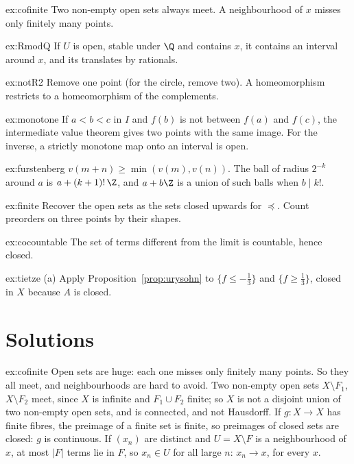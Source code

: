 \begin{hint}{ex:cofinite}
Two non-empty open sets always meet. A neighbourhood of $x$ misses only finitely many points.
\end{hint}
\begin{hint}{ex:RmodQ}
If $U$ is open, stable under $\Q$ and contains $x$, it contains an interval around $x$, and its translates by rationals.
\end{hint}
\begin{hint}{ex:notR2}
Remove one point (for the circle, remove two). A homeomorphism restricts to a homeomorphism of the complements.
\end{hint}
\begin{hint}{ex:monotone}
If $a<b<c$ in $I$ and $f(b)$ is not between $f(a)$ and $f(c)$, the intermediate value theorem gives two points with the same image. For the
inverse, a strictly monotone map onto an interval is open.
\end{hint}
\begin{hint}{ex:furstenberg}
$v(m+n)\ge\min(v(m),v(n))$. The ball of radius $2^{-k}$ around $a$ is $a+(k+1)!\,\Z$, and $a+b\Z$ is a union of such balls when $b\mid k!$.
\end{hint}
\begin{hint}{ex:finite}
Recover the open sets as the sets closed upwards for $\preceq$. Count preorders on three points by their shapes.
\end{hint}
\begin{hint}{ex:cocountable}
The set of terms different from the limit is countable, hence closed.
\end{hint}
\begin{hint}{ex:tietze}
(a) Apply Proposition~\ref{prop:urysohn} to $\{f\le-\frac13\}$ and $\{f\ge\frac13\}$, closed in $X$ because $A$ is closed.
\end{hint}

\section{Solutions}

\begin{solution}{ex:cofinite}
\idea Open sets are huge: each one misses only finitely many points. So they all meet, and neighbourhoods are hard to avoid.
\writeup Two non-empty open sets $X\setminus F_1$, $X\setminus F_2$ meet, since $X$ is infinite and $F_1\cup F_2$ finite; so $X$ is not a disjoint union of two non-empty open sets, and is
connected, and not Hausdorff. If $g:X\to X$ has finite fibres, the preimage of a finite set is finite, so preimages of closed sets are closed: $g$ is
continuous. If $(x_n)$ are distinct and $U=X\setminus F$ is a neighbourhood of $x$, at most $|F|$ terms lie in $F$, so $x_n\in U$ for all large $n$: $x_n\to x$, for every $x$.
\end{solution}

